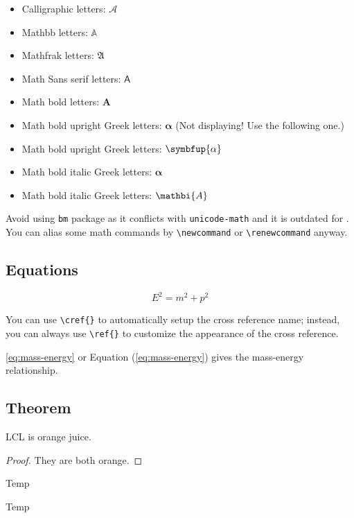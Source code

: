 \begin{itemize}
  \item Calligraphic letters: $\mathcal{A}$ 
  \item Mathbb letters: $\mathbb{A}$
  \item Mathfrak letters: $\mathfrak{A}$
  \item Math Sans serif letters: $\mathsf{A}$
  \item Math bold letters: $\mathbf{A}$
  \item Math bold upright Greek letters: $\mathbf{\alpha}$ (Not displaying! Use the following one.)
  \item Math bold upright Greek letters: $\symbfup{\alpha}$
  \item Math bold italic Greek letters: $\bm{\alpha}$
  \item Math bold italic Greek letters: $\mathbi{A}$
\end{itemize}

Avoid using \lstinline|bm| package as it conflicts with \lstinline|unicode-math| and it is outdated for .
You can alias some math commands by \lstinline|\newcommand| or \lstinline|\renewcommand| anyway.

\subsection{Equations}

\begin{equation}
  E^2 = m^2 + p^2\label{eq:mass-energy}
\end{equation}

You can use \lstinline|\cref{}| to automatically setup the cross reference name; instead, you can always use \lstinline|\ref{}| to customize the appearance of the cross reference.

\cref{eq:mass-energy} or Equation (\ref{eq:mass-energy}) gives the mass-energy relationship.

\subsection{Theorem}

\begin{definition}
  LCL is orange juice.
\end{definition}

\begin{proof}
  They are both orange.
\end{proof}

\begin{algorithm}[htbp]
  \caption{Temp}
  \begin{algorithmic}[1]
    \STATE Temp
  \end{algorithmic}
\end{algorithm}

